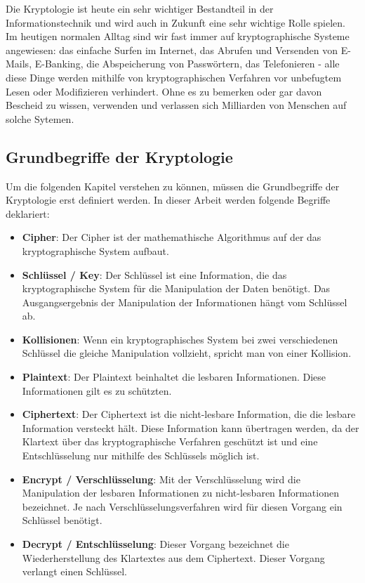 \documentclass[12pt,a4paper]{report}
\begin{document}
\begin{onehalfspace}
Die Kryptologie ist heute ein sehr wichtiger Bestandteil in der Informationstechnik und wird auch in Zukunft eine sehr wichtige Rolle spielen. Im heutigen normalen Alltag sind wir fast immer auf kryptographische Systeme angewiesen: das einfache Surfen im Internet, das Abrufen und Versenden von E-Mails, E-Banking, die Abspeicherung von Passwörtern, das Telefonieren - alle diese Dinge werden mithilfe von kryptographischen Verfahren vor unbefugtem Lesen oder Modifizieren verhindert. Ohne es zu bemerken oder gar davon Bescheid zu wissen, verwenden und verlassen sich Milliarden von Menschen auf solche Sytemen.

\subsection{Grundbegriffe der Kryptologie}

Um die folgenden Kapitel verstehen zu können, müssen die Grundbegriffe der Kryptologie erst definiert werden. In dieser Arbeit werden folgende Begriffe deklariert:

\begin{itemize}
\item \textbf{Cipher}: Der Cipher ist der mathemathische Algorithmus auf der das kryptographische System aufbaut.
\item \textbf{Schlüssel / Key}: Der Schlüssel ist eine Information, die das kryptographische System für die Manipulation der Daten benötigt. Das Ausgangsergebnis der Manipulation der Informationen hängt vom Schlüssel ab.
\item \textbf{Kollisionen}: Wenn ein kryptographisches System bei zwei verschiedenen Schlüssel die gleiche Manipulation vollzieht, spricht man von einer Kollision.
\item \textbf{Plaintext}: Der Plaintext beinhaltet die lesbaren Informationen. Diese Informationen gilt es zu schützten.
\item \textbf{Ciphertext}: Der Ciphertext ist die nicht-lesbare Information, die die lesbare Information versteckt hält. Diese Information kann übertragen werden, da der Klartext über das kryptographische Verfahren geschützt ist und eine Entschlüsselung nur mithilfe des Schlüssels möglich ist.
\item \textbf{Encrypt / Verschlüsselung}: Mit der Verschlüsselung wird die Manipulation der lesbaren Informationen zu nicht-lesbaren Informationen bezeichnet. Je nach Verschlüsselungsverfahren wird für diesen Vorgang ein Schlüssel benötigt.
\item \textbf{Decrypt / Entschlüsselung}: Dieser Vorgang bezeichnet die Wiederherstellung des Klartextes aus dem Ciphertext. Dieser Vorgang verlangt einen Schlüssel.
\end{itemize}


\end{onehalfspace}
\end{document}
